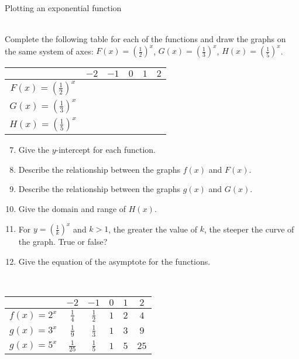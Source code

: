 \begin{wex}{Plotting an exponential function}
{\begin{minipage}{0.8\textwidth}
\vspace*{1em}
\end{minipage}\\Complete the following table for each of the functions and draw the graphs on the same system of axes:
$F(x) =(\frac{1}{2})^{x}$, $G(x) =(\frac{1}{3})^{x}$, $H(x) =(\frac{1}{5})^{x}$.
\begin{table}[H]
\begin{center}
\begin{tabular}{|c|c|c|c|c|c|}
\hline
   &  $-2$ & $-1$ & $0$ & $1$ & $2$ 
\\ \hline
$F(x)=(\frac{1}{2})^{x}$&  \hspace{1cm}  & \hspace{1cm} & \hspace{1cm} & \hspace{1cm} & \hspace{1cm} 
\\ \hline
$G(x)=(\frac{1}{3})^{x}$&  &&&&
\\ \hline
$H(x)=(\frac{1}{5})^{x}$&  &&&&
\\ \hline
\end{tabular}
\end{center}
\end{table}

\begin{minipage}{0.8\textwidth}
\begin{enumerate}[noitemsep, label=\textbf{\arabic*}. ] 
\setcounter{enumi}{6}
 \item Give the $y$-intercept for each function.
\item Describe the relationship between the graphs $f(x)$ and $F(x)$.
\item Describe the relationship between the graphs $g(x)$ and $G(x)$.
\item Give the domain and range of $H(x)$.
\item For $y=(\frac{1}{k})^{x}$ and $k>1$, the greater the value of $k$, the steeper the curve of the graph. True or false?
\item Give the equation of the asymptote for the functions.
\end{enumerate}
\end{minipage}\\
}
{
\begin{table}[H]
\begin{center}
\begin{tabular}{|c|c|c|c|c|c|}
\hline
   &  $-2$ & $-1$ & $0$ & $1$ & $2$ 
\\ \hline
 $f(x)=2^{x}$& $\frac{1}{4}$ &$\frac{1}{2}$&$1$&$2$&$4$
\\ \hline
 $g(x)=3^{x}$& $\frac{1}{9}$ &$\frac{1}{3}$&$1$&$3$&$9$
\\ \hline
 $g(x)=5^{x}$& $\frac{1}{25}$ &$\frac{1}{5}$&$1$&$5$&$25$
\\ \hline


\end{tabular}
\end{center}
\end{table}}
\end{wex}
